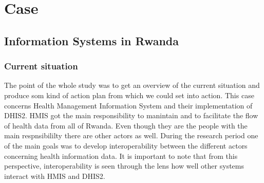 \chapter{Case}


\section{Information Systems in Rwanda}
\subsection{Current situation}
The point of the whole study was to get an overview of the current situation and produce som kind of action plan from which we could set into action.
This case concerns Health Management Information System and their implementation of DHIS2. HMIS got the main responsibility to manintain and to facilitate the flow of health data from all of Rwanda. Even though they are the people with the main respnsibililty there are other actors as well. 
During the research period one of the main goals was to develop interoperability between the different actors concerning health information data. 
It is important to note that from this perspective, interoperability is seen through the lens how well other systems interact with HMIS and DHIS2.  
